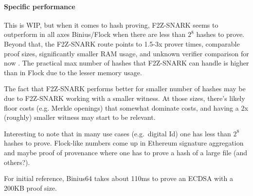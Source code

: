 \documentclass[11pt,letterpaper,usenames,dvipsnames]{article}
\begin{document}
\paragraph{Specific performance}
This is WIP, but when it comes to hash proving, F2Z-SNARK seems to outperform in all axes Binius/Flock when there are less than $2^8$ hashes to prove. Beyond that, the F2Z-SNARK route points to 1.5-3x prover times, comparable proof sizes, significantly smaller RAM usage, and unknown verifier comparison for now . The practical max number of hashes that F2Z-SNARK can handle is higher  than in Flock due to the lesser memory usage.

The fact that F2Z-SNARK performs better for smaller number of hashes may be due to F2Z-SNARK working with a smaller witness. At those sizes, there's likely floor costs (e.g. Merkle openings) that somewhat dominate costs, and having a 2x (roughly) smaller witness may start to be relevant. 

Interesting to note that in many use cases (e.g.\ digital Id) one has less than $2^8$ hashes to prove. Flock-like numbers come up in Ethereum signature aggregation and maybe proof of provenance where one has to prove a hash of a large file (and others?).



For initial reference, Binius64 takes about 110ms to prove an ECDSA with a 200KB proof size.
\end{document}
